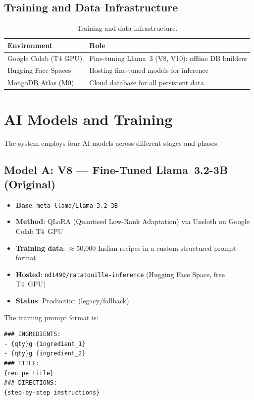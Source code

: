 \documentclass[12pt, a4paper]{article}
\begin{document}
\subsection{Training and Data Infrastructure}

\begin{table}[H]
\centering
\caption{Training and data infrastructure.}
\label{tab:training}
\begin{tabularx}{\textwidth}{l X}
\toprule
\textbf{Environment} & \textbf{Role} \\
\midrule
Google Colab (T4 GPU)  & Fine-tuning Llama~3 (V8, V10); offline DB builders \\
Hugging Face Spaces    & Hosting fine-tuned models for inference \\
MongoDB Atlas (M0)     & Cloud database for all persistent data \\
\bottomrule
\end{tabularx}
\end{table}

\section{AI Models and Training}

The system employs four AI models across different stages and phases.

\subsection{Model A: V8 --- Fine-Tuned Llama~3.2-3B (Original)}

\begin{itemize}
  \item \textbf{Base}: \texttt{meta-llama/Llama-3.2-3B}
  \item \textbf{Method}: QLoRA (Quantised Low-Rank Adaptation) via Unsloth on Google Colab T4~GPU
  \item \textbf{Training data}: $\approx$50,000 Indian recipes in a custom structured prompt format
  \item \textbf{Hosted}: \texttt{nd1490/ratatouille-inference} (Hugging Face Space, free T4~GPU)
  \item \textbf{Status}: Production (legacy/fallback)
\end{itemize}

The training prompt format is:
\begin{lstlisting}[style=text, caption={V10 recipe prompt schema (also used for V8 training)}]
### INGREDIENTS:
- {qty}g {ingredient_1}
- {qty}g {ingredient_2}
### TITLE:
{recipe title}
### DIRECTIONS:
{step-by-step instructions}
\end{lstlisting}
\end{document}
